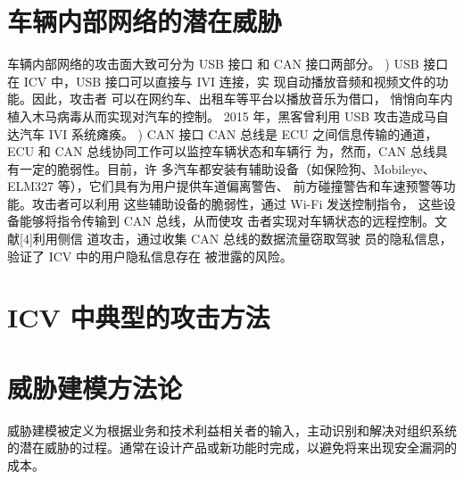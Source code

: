 \section{车辆内部网络的潜在威胁}
车辆内部网络的攻击面大致可分为 USB 接口
和 CAN 接口两部分。
) USB 接口
在 ICV 中，USB 接口可以直接与 IVI 连接，实
现自动播放音频和视频文件的功能。因此，攻击者
可以在网约车、出租车等平台以播放音乐为借口，
悄悄向车内植入木马病毒从而实现对汽车的控制。
2015 年，黑客曾利用 USB 攻击造成马自达汽车 IVI
系统瘫痪。
) CAN 接口
CAN 总线是 ECU 之间信息传输的通道，ECU
和 CAN 总线协同工作可以监控车辆状态和车辆行
为，然而，CAN 总线具有一定的脆弱性。目前，许
多汽车都安装有辅助设备（如保险狗、Mobileye、
ELM327 等），它们具有为用户提供车道偏离警告、
前方碰撞警告和车速预警等功能。攻击者可以利用
这些辅助设备的脆弱性，通过 Wi-Fi 发送控制指令，
这些设备能够将指令传输到 CAN 总线，从而使攻
击者实现对车辆状态的远程控制。文献[4]利用侧信
道攻击，通过收集 CAN 总线的数据流量窃取驾驶
员的隐私信息，验证了 ICV 中的用户隐私信息存在
被泄露的风险。

\section{ICV 中典型的攻击方法}



\section{威胁建模方法论}
威胁建模被定义为根据业务和技术利益相关者的输入，主动识别和解决对组织系统的潜在威胁的过程。通常在设计产品或新功能时完成，以避免将来出现安全漏洞的成本。

